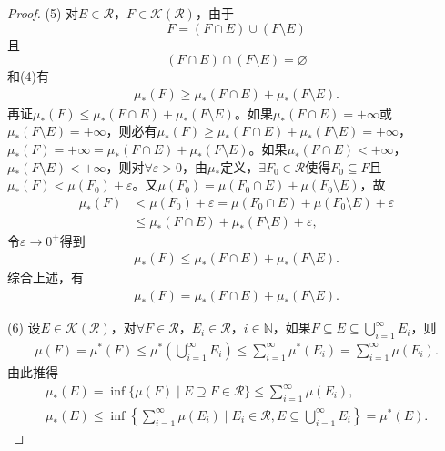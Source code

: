 \documentclass[../../main.tex]{subfiles}%
\begin{document}
\begin{proof}
(5) 对$E\in\mathscr{R}$，$F\in\mathscr{K}(\mathscr{R})$，由于
\[
F = (F\cap E)\cup (F\setminus E)
\]
且
\[
(F\cap E)\cap (F\setminus E) = \varnothing
\]
和(4)有
\begin{align*}
\mu_*(F)\geqslant \mu_*(F\cap E) + \mu_*(F\setminus E).
\end{align*}
再证$\mu_*(F)\leqslant \mu_*(F\cap E) + \mu_*(F\setminus E)$。如果$\mu_*(F\cap E)=+\infty$或$\mu_*(F\setminus E)=+\infty$，则必有$\mu_*(F)\geqslant \mu_*(F\cap E) + \mu_*(F\setminus E)=+\infty$，$\mu_*(F)=+\infty=\mu_*(F\cap E) + \mu_*(F\setminus E)$。如果$\mu_*(F\cap E)<+\infty$，$\mu_*(F\setminus E)<+\infty$，则对$\forall\varepsilon>0$，由$\mu_*$定义，$\exists F_0\in\mathscr{R}$使得$F_0\subseteq F$且$\mu_*(F)<\mu(F_0)+\varepsilon$。又$\mu(F_0)=\mu(F_0\cap E)+\mu(F_0\setminus E)$，故
\begin{align*}
\mu_*(F) &< \mu(F_0) + \varepsilon = \mu(F_0\cap E) + \mu(F_0\setminus E) + \varepsilon \\
&\leqslant \mu_*(F\cap E) + \mu_*(F\setminus E) + \varepsilon,
\end{align*}
令$\varepsilon\to 0^+$得到
\begin{align*}
\mu_*(F)\leqslant \mu_*(F\cap E) + \mu_*(F\setminus E).
\end{align*}
综合上述，有
\begin{align*}
\mu_*(F) = \mu_*(F\cap E) + \mu_*(F\setminus E).
\end{align*}

(6) 设$E\in\mathscr{K}(\mathscr{R})$，对$\forall F\in\mathscr{R}$，$E_i\in\mathscr{R}$，$i\in\mathbb{N}$，如果$F\subseteq E\subseteq \bigcup\limits_{i=1}^{\infty}E_i$，则
\begin{align*}
\mu(F) = \mu^*(F)\leqslant \mu^*\left(\bigcup\limits_{i=1}^{\infty}E_i\right)\leqslant \sum\limits_{i=1}^{\infty}\mu^*(E_i) = \sum\limits_{i=1}^{\infty}\mu(E_i).
\end{align*}
由此推得
\begin{align*}
\mu_*(E) = \inf\{\mu(F) \mid E\supseteq F\in\mathscr{R}\} \leqslant \sum\limits_{i=1}^{\infty}\mu(E_i), \\
\mu_*(E)\leqslant \inf\left\{\sum\limits_{i=1}^{\infty}\mu(E_i) \mid E_i\in\mathscr{R}, E\subseteq \bigcup\limits_{i=1}^{\infty}E_i\right\} = \mu^*(E).
\end{align*}
\end{proof}
\end{document}
